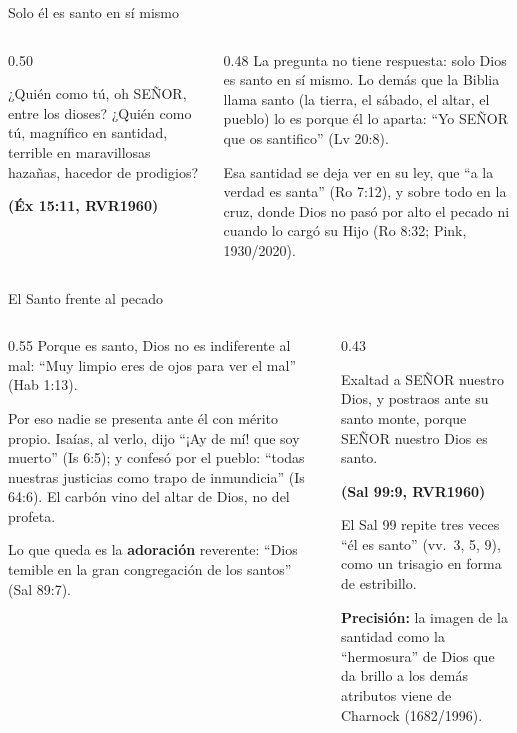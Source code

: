 \documentclass[hyperref={bookmarks=false},aspectratio=169]{beamer}
\newcommand{\SENOR}{S{\fontsize{0.78em}{1em}\selectfont EÑOR}}
\newcommand{\fuente}[1]{\par\hfill{\upshape\bfseries\footnotesize\textcolor{azul}{#1}}}
\newcommand{\destacar}[1]{\textbf{\textcolor{azul}{#1}}}
\newcommand{\precision}[1]{{\footnotesize\color{gris}\textbf{Precisión:} #1}}
\begin{document}
\begin{frame}{Solo él es santo en sí mismo}
\begin{columns}[t,onlytextwidth]
\begin{column}{0.50\textwidth}
\begin{cita}¿Quién como tú, oh \SENOR{}, entre los dioses? ¿Quién como tú, magnífico en santidad, terrible en maravillosas hazañas, hacedor de prodigios?\fuente{(Éx 15:11, RVR1960)}\end{cita}
\end{column}
\begin{column}{0.48\textwidth}\small
La pregunta no tiene respuesta: solo Dios es santo en sí mismo. Lo demás que la Biblia llama santo (la tierra, el sábado, el altar, el pueblo) lo es porque él lo aparta: ``Yo \SENOR{} que os santifico'' (Lv 20:8).\par\medskip
Esa santidad se deja ver en su ley, que ``a la verdad es santa'' (Ro 7:12), y sobre todo en la cruz, donde Dios no pasó por alto el pecado ni cuando lo cargó su Hijo (Ro 8:32; Pink, 1930/2020).
\end{column}
\end{columns}
\end{frame}

\begin{frame}{El Santo frente al pecado}
\begin{columns}[t,onlytextwidth]
\begin{column}{0.55\textwidth}\small
Porque es santo, Dios no es indiferente al mal: ``Muy limpio eres de ojos para ver el mal'' (Hab 1:13).\par\medskip
Por eso nadie se presenta ante él con mérito propio. Isaías, al verlo, dijo ``¡Ay de mí! que soy muerto'' (Is 6:5); y confesó por el pueblo: ``todas nuestras justicias como trapo de inmundicia'' (Is 64:6). El carbón vino del altar de Dios, no del profeta.\par\medskip
Lo que queda es la \destacar{adoración} reverente: ``Dios temible en la gran congregación de los santos'' (Sal 89:7).
\end{column}
\begin{column}{0.43\textwidth}
\begin{cita}Exaltad a \SENOR{} nuestro Dios, y postraos ante su santo monte, porque \SENOR{} nuestro Dios es santo.\fuente{(Sal 99:9, RVR1960)}\end{cita}
\footnotesize El Sal 99 repite tres veces ``él es santo'' (vv.~3, 5, 9), como un trisagio en forma de estribillo.\par\smallskip
\precision{la imagen de la santidad como la ``hermosura'' de Dios que da brillo a los demás atributos viene de Charnock (1682/1996).}
\end{column}
\end{columns}
\end{frame}
\end{document}
